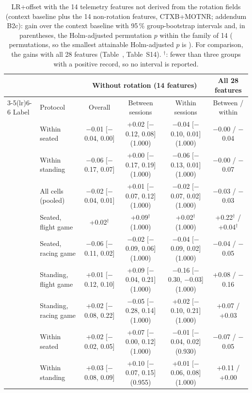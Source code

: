 \begin{table}[ht]
\centering
\scriptsize
\caption{LR+offset with the 14 telemetry features not derived from the rotation fields (context baseline plus the 14 non-rotation features, CTXB+MOTNR; addendum B2c): gain over the context baseline with 95\,\% group-bootstrap intervals and, in parentheses, the Holm-adjusted permutation $p$ within the family of 14 ( permutations, so the smallest attainable Holm-adjusted $p$ is ). For comparison, the gains with all 28 features (Table~, Table~S14). $^\dagger$: fewer than three groups with a positive record, so no interval is reported.}
\label{tab:supp_nr}
\setlength{\tabcolsep}{3pt}
\begin{tabular}{@{}llcccc@{}}
\toprule
 & & \multicolumn{3}{c}{Without rotation (14 features)} & All 28 features \\
\cmidrule(lr){3-5}\cmidrule(lr){6-6}
Label & Protocol & Overall & Between sessions & Within sessions & Between / within \\
\midrule
\sevtwo{} & Within seated & $-$0.01 [$-$0.04, 0.00] & +0.02 [$-$0.12, 0.08] (1.000) & $-$0.04 [$-$0.10, 0.01] (1.000) & $-$0.00 / $-$0.04 \\
 & Within standing & $-$0.06 [$-$0.17, 0.07] & +0.00 [$-$0.17, 0.19] (1.000) & $-$0.06 [$-$0.13, 0.01] (1.000) & $-$0.00 / $-$0.07 \\
 & All cells (pooled) & $-$0.02 [$-$0.04, 0.01] & +0.01 [$-$0.07, 0.12] (1.000) & $-$0.02 [$-$0.07, 0.02] (1.000) & $-$0.03 / $-$0.03 \\
 & Seated, flight game & +0.02$^\dagger$ & +0.09$^\dagger$ (1.000) & +0.02$^\dagger$ (1.000) & +0.22$^\dagger$ / +0.04$^\dagger$ \\
 & Seated, racing game & $-$0.06 [$-$0.11, 0.02] & $-$0.02 [$-$0.09, 0.06] (1.000) & $-$0.04 [$-$0.09, 0.02] (1.000) & $-$0.04 / $-$0.05 \\
 & Standing, flight game & +0.01 [$-$0.12, 0.10] & +0.09 [$-$0.04, 0.21] (1.000) & $-$0.16 [$-$0.30, $-$0.03] (1.000) & +0.08 / $-$0.16 \\
 & Standing, racing game & +0.02 [$-$0.08, 0.22] & $-$0.05 [$-$0.28, 0.14] (1.000) & +0.02 [$-$0.10, 0.21] (1.000) & +0.07 / +0.03 \\
\midrule
\sevone{} & Within seated & +0.02 [$-$0.02, 0.05] & +0.07 [$-$0.00, 0.12] (1.000) & $-$0.01 [$-$0.04, 0.02] (0.930) & $-$0.07 / $-$0.05 \\
 & Within standing & +0.03 [$-$0.08, 0.09] & +0.10 [$-$0.07, 0.15] (0.955) & +0.01 [$-$0.06, 0.08] (1.000) & +0.11 / +0.00 \\

\end{tabular}
\end{table}
